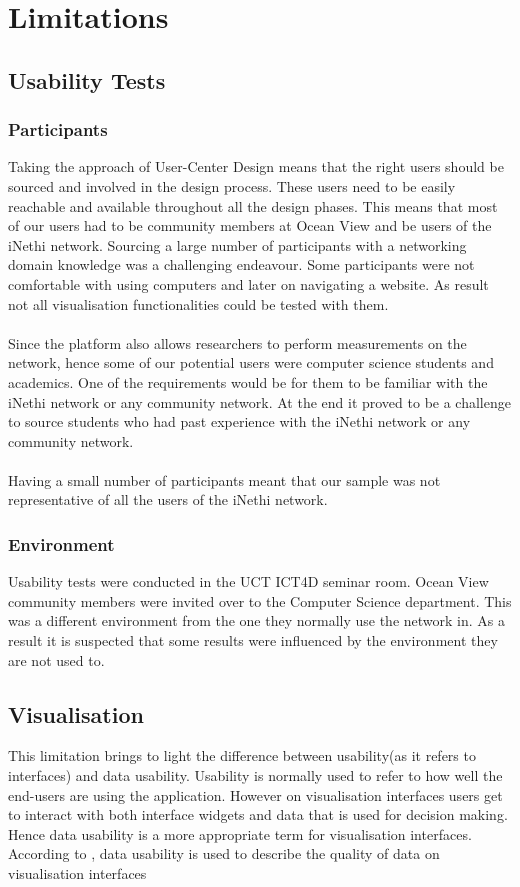 \section{Limitations}
\subsection{Usability Tests}
\subsubsection{Participants}
Taking the approach of User-Center Design means that the right users should be sourced and involved in the design process. These users need to be easily reachable and available throughout all the design phases. This means that most of our users had to be community members at Ocean View and be users of the iNethi network. Sourcing a large number of participants with a networking domain knowledge was a challenging endeavour. Some participants were not comfortable with using computers and later on navigating a website. As result not all visualisation functionalities could be tested with them.
\paragraph{}
Since the platform also allows researchers to perform measurements on the network, hence some of our potential users were computer science students and academics. One of the requirements would be for them to be familiar with the iNethi network or any community network. At the end it proved to be a challenge to source students who had past experience with the iNethi network or any community network.
\paragraph{}
Having a small number of participants meant that our sample was not representative of all the users of the iNethi network.

\subsubsection{Environment}
Usability tests were conducted in the UCT ICT4D seminar room. Ocean View community members were invited over to the Computer Science department. This was a different environment from the one they normally use the network in. As a result it is suspected that some results were influenced by the environment they are not used to.
\subsection{Visualisation}
This limitation brings to light the difference between usability(as it refers to interfaces) and data usability. Usability is normally used to refer to how well the end-users are using the application\cite{Luciana}. However on visualisation interfaces users get to interact with both interface widgets and data that is used for decision making\cite{Luciana}. Hence data usability is a more appropriate term for visualisation interfaces. According to \cite{Luciana}, data usability is used to describe the quality of data on visualisation interfaces
